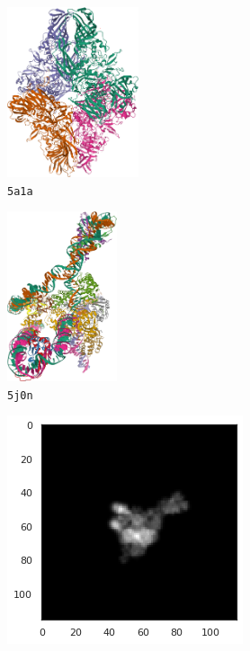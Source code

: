 \begin{figure}[ht!]
    \centering
    \begin{minipage}[b]{0.55\linewidth}
        \centering
        \begin{subfigure}[b]{0.49\linewidth}
            \centering
            \includegraphics[height=5cm]{figures/5a1a_pdb.png}
            \caption*{\texttt{5a1a}}
        \end{subfigure}
        \hfill
        \begin{subfigure}[b]{0.42\linewidth}
            \centering
            \includegraphics[height=5cm]{figures/5j0n_pdb.png}
            \caption*{\texttt{5j0n}}
        \end{subfigure}
        \caption{%
            Ground-truth atomic models: the $\beta$-galactosidase (\texttt{5a1a}), and the lambda excision HJ intermediate (\texttt{5j0n}).
        }\label{fig:pdb-proteins}
    \end{minipage}
    \hfill
    \begin{minipage}[b]{0.35\linewidth}
        \centering
        \begin{subfigure}[b]{0.49\linewidth}
            \centering
            \includegraphics[width=0.8\linewidth]{figures/5j0n_noise0}

\end{subfigure}
\end{minipage}
\end{figure}
